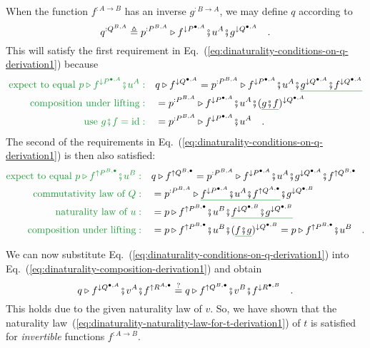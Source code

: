 When the function $f^{:A\rightarrow B}$ has an inverse $g^{:B\rightarrow A}$,
we may define $q$ according to
\[
q^{:Q^{B,A}}\triangleq p^{:P^{B,A}}\triangleright f^{\downarrow P^{\bullet,A}}\bef u^{A}\bef g^{\downarrow Q^{\bullet,A}}\quad.
\]
This will satisfy the first requirement in Eq.~(\ref{eq:dinaturality-conditions-on-q-derivation1})
because
\begin{align*}
{\color{greenunder}\text{expect to equal }p\triangleright f^{\downarrow P^{\bullet,A}}\bef u^{A}:}\quad & q\triangleright f^{\downarrow Q^{\bullet,A}}=p^{:P^{B,A}}\triangleright f^{\downarrow P^{\bullet,A}}\bef u^{A}\bef\gunderline{g^{\downarrow Q^{\bullet,A}}\bef f^{\downarrow Q^{\bullet,A}}}\\
{\color{greenunder}\text{composition under lifting}:}\quad & =p^{:P^{B,A}}\triangleright f^{\downarrow P^{\bullet,A}}\bef u^{A}\bef(\gunderline{g\bef f})^{\downarrow Q^{\bullet,A}}\\
{\color{greenunder}\text{use }g\bef f=\text{id}:}\quad & =p^{:P^{B,A}}\triangleright f^{\downarrow P^{\bullet,A}}\bef u^{A}\quad.
\end{align*}
The second of the requirements in Eq.~(\ref{eq:dinaturality-conditions-on-q-derivation1})
is then also satisfied:
\begin{align*}
{\color{greenunder}\text{expect to equal }p\triangleright f^{\uparrow P^{B,\bullet}}\bef u^{B}:}\quad & q\triangleright f^{\uparrow Q^{B,\bullet}}=p^{:P^{B,A}}\triangleright f^{\downarrow P^{\bullet,A}}\bef u^{A}\bef g^{\downarrow Q^{\bullet,A}}\bef f^{\uparrow Q^{B,\bullet}}\\
{\color{greenunder}\text{commutativity law of }Q:}\quad & =p^{:P^{B,A}}\triangleright\gunderline{f^{\downarrow P^{\bullet,A}}\bef u^{A}\bef f^{\uparrow Q^{A,\bullet}}}\bef g^{\downarrow Q^{\bullet,B}}\\
{\color{greenunder}\text{naturality law of }u:}\quad & =p\triangleright f^{\uparrow P^{B,\bullet}}\bef u^{B}\bef\gunderline{f^{\downarrow Q^{\bullet,B}}\bef g^{\downarrow Q^{\bullet,B}}}\\
{\color{greenunder}\text{composition under lifting}:}\quad & =p\triangleright f^{\uparrow P^{B,\bullet}}\bef u^{B}\bef(\gunderline{f\bef g})^{\downarrow Q^{\bullet,B}}=p\triangleright f^{\uparrow P^{B,\bullet}}\bef u^{B}\quad.
\end{align*}

We can now substitute Eq.~(\ref{eq:dinaturality-conditions-on-q-derivation1})
into Eq.~(\ref{eq:dinaturality-composition-derivation1}) and obtain
\[
q\triangleright f^{\downarrow Q^{\bullet,A}}\bef v^{A}\bef f^{\uparrow R^{A,\bullet}}\overset{?}{=}q\triangleright f^{\uparrow Q^{B,\bullet}}\bef v^{B}\bef f^{\downarrow R^{\bullet,B}}\quad.
\]
This holds due to the given naturality law of $v$. So, we have shown
that the naturality law~(\ref{eq:dinaturality-naturality-law-for-t-derivation1})
of $t$ is satisfied for \emph{invertible} functions $f^{:A\rightarrow B}$.

